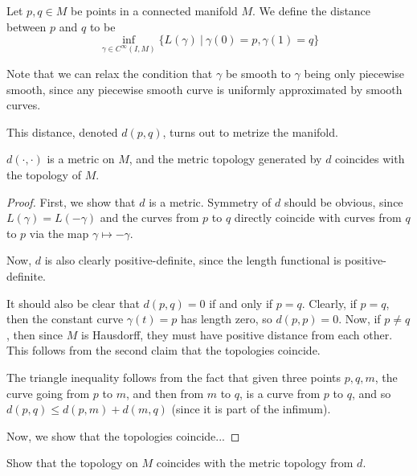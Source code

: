 \documentclass[../main.tex]{subfiles}
\begin{document}
\begin{defn}
    Let $p,q\in M$ be points in a connected manifold $M$. We define the distance
    between $p$ and $q$ to be
    \[
        \inf_{\gamma\in C^{\infty}(I,M)}\{L(\gamma)\ |\ \gamma(0)=p,\gamma(1)=q\}
    \]
\end{defn}
Note that we can relax the condition that $\gamma$ be smooth to $\gamma$ being
only piecewise smooth, since any piecewise smooth curve is uniformly
approximated by smooth curves.

This distance, denoted $d(p,q)$, turns out to metrize the manifold.
\begin{theorem}
    $d(\cdot,\cdot)$ is a metric on $M$, and the metric topology generated by
    $d$ coincides with the topology of $M$.
\end{theorem}

\begin{proof}
    First, we show that $d$ is a metric. Symmetry of $d$ should be obvious,
    since $L(\gamma)=L(-\gamma)$ and the curves from $p$ to $q$ directly
    coincide with curves from $q$ to $p$ via the map $\gamma\mapsto-\gamma$. 

    Now, $d$ is also clearly positive-definite, since the length functional is
    positive-definite.

    It should also be clear that $d(p,q)=0$ if and only if $p=q$. Clearly, if
    $p=q$, then the constant curve $\gamma(t)=p$ has length zero, so $d(p,p) =
    0$. Now, if $p\neq q$, then since $M$ is Hausdorff, they must have positive
    distance from each other. This follows from the second claim that the
    topologies coincide.

    The triangle inequality follows from the fact that given three points
    $p,q,m$, the curve going from $p$ to $m$, and then from $m$ to $q$, is a
    curve from $p$ to $q$, and so $d(p,q)\leq d(p,m)+d(m,q)$ (since it is part
    of the infimum).

    Now, we show that the topologies coincide...
\end{proof}
\begin{hw}
Show that the topology on $M$ coincides with the metric topology from $d$.
\end{hw}
\end{document}
